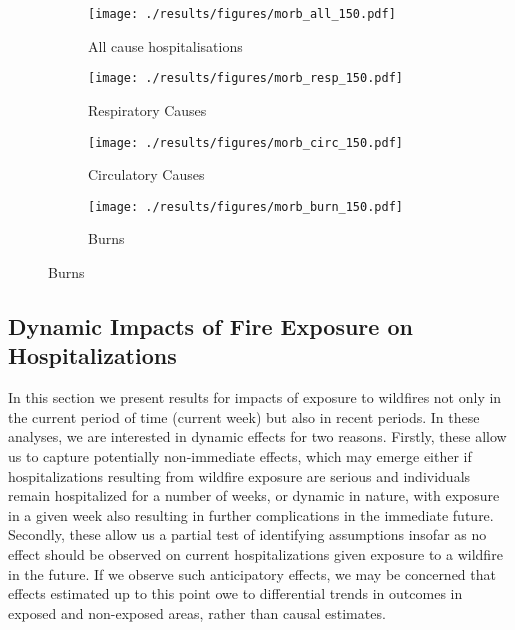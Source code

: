 \documentclass[11pt]{article}
\begin{document}
\begin{spacing}{1.5}
\begin{figure}[ht!]
    \centering
    \caption{Impacts of Fire Exposure (Upwind) on Age-Specific Hospitalisations, by Cause}
    \label{fig:hospRF_byAge_types}
    \begin{subfigure}{0.49\textwidth}
    \centering
    \texttt{[image: ./results/figures/morb\_all\_150.pdf]}
    \caption{All cause hospitalisations}
    \end{subfigure}    
    \begin{subfigure}{0.49\textwidth}
    \centering
    \texttt{[image: ./results/figures/morb\_resp\_150.pdf]}
    \caption{Respiratory Causes}
    \end{subfigure}    
    \begin{subfigure}{0.49\textwidth}
    \centering
    \texttt{[image: ./results/figures/morb\_circ\_150.pdf]}
    \caption{Circulatory Causes}
    \end{subfigure}    
    \begin{subfigure}{0.49\textwidth}
    \centering
    \texttt{[image: ./results/figures/morb\_burn\_150.pdf]}
    \caption{Burns}
    \end{subfigure}    
\end{figure}

\subsection{Dynamic Impacts of Fire Exposure on Hospitalizations}
\label{sscn:dynmaicEffects}
In this section we present results for impacts of exposure to wildfires not only in the current period of time (current week) but also in recent periods.  In these analyses, we are interested in dynamic effects for two reasons.  Firstly, these allow us to capture potentially non-immediate effects, which may emerge either if hospitalizations resulting from wildfire exposure are serious and individuals remain hospitalized for a number of weeks, or dynamic in nature, with exposure in a given week also resulting in further complications in the immediate future.  Secondly, these allow us a partial test of identifying assumptions insofar as no effect should be observed on current hospitalizations given exposure to a wildfire in the future.  If we observe such anticipatory effects, we may be concerned that effects estimated up to this point owe to differential trends in outcomes in exposed and non-exposed areas, rather than causal estimates.


\end{spacing}
\end{document}
